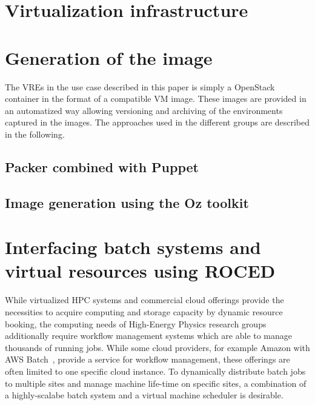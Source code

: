 \section{Virtualization infrastructure}
\label{sec:openstack}


\section{Generation of the image}
The VREs in the use case described in this paper is simply a OpenStack container
in the format of a compatible VM image.
These images are provided in an automatized
way allowing versioning and archiving of the environments captured in
the images. The approaches used in the
different groups are described in the following.

\subsection{Packer combined with Puppet}





\subsection{Image generation using the Oz toolkit}


\section{Interfacing batch systems and virtual resources using ROCED}
\label{section:roced}
While virtualized HPC systems and commercial cloud offerings provide the necessities to acquire computing and storage capacity by dynamic resource booking, the computing needs of High-Energy Physics research groups additionally require workflow management systems which are able to manage thousands of running jobs. While some cloud providers, for example Amazon with AWS Batch~\cite{awsbatch}, provide a service for workflow management, these offerings are often limited to one specific cloud instance. To dynamically distribute batch jobs to multiple sites and manage machine life-time on specific sites, a combination of a highly-scalabe batch system and a virtual machine scheduler is desirable.

